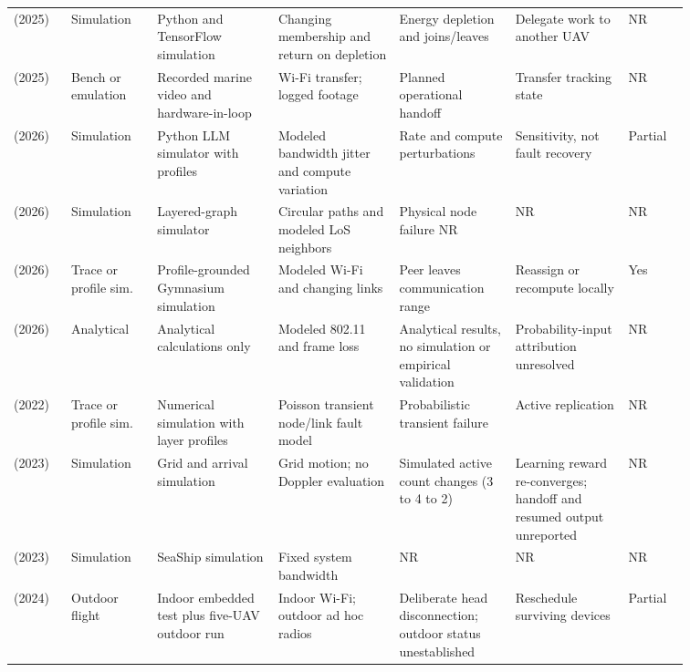 \begin{table}[!tp]
\begin{tabular}{@{}Y{0.0705\linewidth}Y{0.1090\linewidth}Y{0.1598\linewidth}Y{0.1532\linewidth}Y{0.1466\linewidth}Y{0.1438\linewidth}Y{0.0724\linewidth}@{}}
\cite{R0068}\newline\mbox{(2025)} & Simulation & Python and TensorFlow simulation & Changing membership and return on depletion & Energy depletion and joins\allowbreak{}/leaves & Delegate work to another UAV & NR \\
\cite{R0292}\newline\mbox{(2025)} & Bench or emulation & Recorded marine video and hardware-in-loop & Wi-Fi transfer; logged footage & Planned operational handoff & Transfer tracking state & NR \\
\cite{R0074}\newline\mbox{(2026)} & Simulation & Python LLM simulator with profiles & Modeled bandwidth jitter and compute variation & Rate and compute perturbations & Sensitivity, not fault recovery & Partial \\
\cite{R0077}\newline\mbox{(2026)} & Simulation & Layered-graph simulator & Circular paths and modeled LoS neighbors & Physical node failure NR & NR & NR \\
\cite{R0092}\newline\mbox{(2026)} & Trace or profile sim. & Profile-grounded Gymnasium simulation & Modeled Wi-Fi and changing links & Peer leaves communication range & Reassign or recompute locally & Yes \\
\cite{R0121}\newline\mbox{(2026)} & Analytical & Analytical calculations only & Modeled 802.11 and frame loss & Analytical results, no simulation or empirical validation & Probability-input attribution unresolved & NR \\
\cite{R0029}\newline\mbox{(2022)} & Trace or profile sim. & Numerical simulation with layer profiles & Poisson transient node\allowbreak{}/link fault model & Probabilistic transient failure & Active replication & NR \\
\cite{R0019}\newline\mbox{(2023)} & Simulation & Grid and arrival simulation & Grid motion; no Doppler evaluation & Simulated active count changes (3 to 4 to 2) & Learning reward re-converges; handoff and resumed output unreported & NR \\
\cite{R0043}\newline\mbox{(2023)} & Simulation & SeaShip simulation & Fixed system bandwidth & NR & NR & NR \\
\cite{R0014}\newline\mbox{(2024)} & Outdoor flight & Indoor embedded test plus five-UAV outdoor run & Indoor Wi-Fi; outdoor ad hoc radios & Deliberate head disconnection; outdoor status unestablished & Reschedule surviving devices & Partial \\

\end{tabular}
\end{table}
